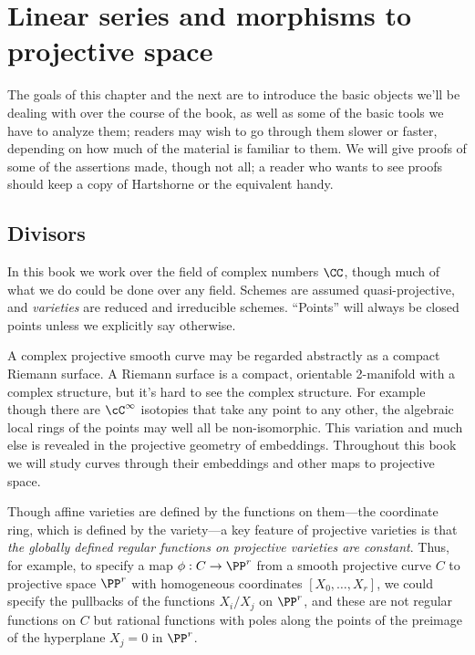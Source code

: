 

\chapter{Linear series and morphisms to projective space}\label{linear series}

The goals of this chapter and the next are to introduce the basic objects we'll be dealing with over the course of the book, as well as some of the basic tools we have to analyze them; readers may wish to go through them slower or faster, depending on how much of the material is familiar to them. We will give proofs of some of the assertions made, though not all; a reader who wants to see proofs should keep a copy of Hartshorne or the equivalent handy.


\section{Divisors}

In this book we work over the field of complex numbers $\CC$, though much of what we do
could be done over any field. 
Schemes are assumed quasi-projective, and \emph{varieties} are reduced and irreducible schemes. ``Points'' will always be closed points unless we explicitly say otherwise.

A complex projective smooth curve may  be regarded abstractly as a compact Riemann surface. A Riemann surface is a compact, orientable 2-manifold with a complex structure, but it's hard to see the complex structure. For example though there
are $\cC^\infty$ isotopies that take any point to any other, the algebraic local rings of the points may well all be non-isomorphic. This variation and much else is revealed in the projective geometry of embeddings. Throughout this book we will study curves through their embeddings and other maps to projective space. 

Though affine varieties are defined by the functions on them---the coordinate ring, which is defined by the variety---a key feature of projective varieties is that \emph{the globally defined regular functions on projective varieties are constant}. Thus, for example, to specify a map $\phi : C \to \PP^r$ from a smooth projective curve $C$ to projective space $\PP^r$ with homogeneous coordinates $[X_0,\dots,X_r]$, we could specify the pullbacks of the functions $X_i/X_j$ on $\PP^r$, and these are not regular functions on $C$ but rational functions with poles along the points of the preimage of the hyperplane $X_j = 0$ in $\PP^r$.

